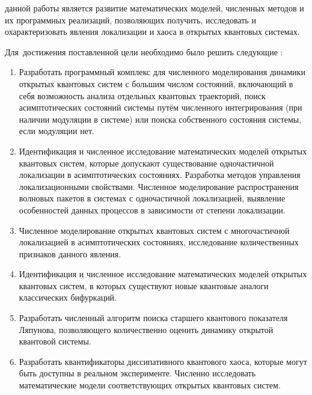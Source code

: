 {\aim} данной работы является развитие математических моделей, численных методов и их программных реализаций, позволяющих получить, исследовать и охарактеризовать явления локализации и хаоса в открытых квантовых системах.

Для~достижения поставленной цели необходимо было решить следующие {\tasks}:
\begin{enumerate}[beginpenalty=10000] %
	\item Разработать программный комплекс для численного моделирования динамики открытых квантовых систем с большим числом состояний, включающий в себя возможность анализа отдельных квантовых траекторий, поиск асимптотических состояний системы путём численного интегрирования (при наличии модуляции в системе) или поиска собственного состояния системы, если модуляции нет.
	\item Идентификация и численное исследование математических моделей открытых квантовых систем, которые допускают существование одночастичной локализации в асимптотических состояниях. Разработка методов управления локализационными свойствами. Численное моделирование распространения волновых пакетов в системах с одночастичной локализацией, выявление особенностей данных процессов в зависимости от степени локализации.
	\item Численное моделирование открытых квантовых систем с многочастичной локализацией в асимптотических состояниях, исследование количественных признаков данного явления.
	\item Идентификация и численное исследование математических моделей открытых квантовых систем, в которых существуют новые квантовые аналоги классических бифуркаций.
	\item Разработать численный алгоритм поиска старшего квантового показателя Ляпунова, позволяющего количественно оценить динамику открытой квантовой системы.
	\item Разработать квантификаторы диссипативного квантового хаоса, которые могут быть доступны в реальном эксперименте. Численно исследовать математические модели соответствующих открытых квантовых систем. 
\end{enumerate}


